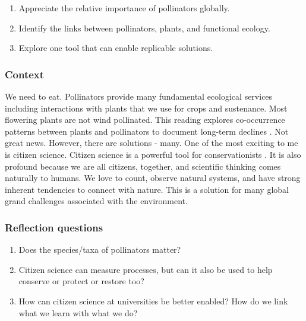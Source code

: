 \documentclass[
]{book}
\providecommand{\tightlist}{%
  \setlength{\itemsep}{0pt}\setlength{\parskip}{0pt}}
\begin{document}
\begin{enumerate}
\def\labelenumi{\arabic{enumi}.}
\tightlist
\item
  Appreciate the relative importance of pollinators globally.
\item
  Identify the links between pollinators, plants, and functional ecology.\\
\item
  Explore one tool that can enable replicable solutions.
\end{enumerate}

\hypertarget{context-1}{%
\subsubsection*{Context}\label{context-1}}

We need to eat. Pollinators provide many fundamental ecological services including interactions with plants that we use for crops and sustenance. Most flowering plants are not wind pollinated. This reading explores co-occurrence patterns between plants and pollinators to document long-term declines \citep{RN6388}. Not great news. However, there are solutions - many. One of the most exciting to me is citizen science. Citizen science is a powerful tool for conservationists \citep{RN5997}. It is also profound because we are all citizens, together, and scientific thinking comes naturally to humans. We love to count, observe natural systems, and have strong inherent tendencies to connect with nature. This is a solution for many global grand challenges associated with the environment.

\hypertarget{reflection-questions-1}{%
\subsubsection*{Reflection questions}\label{reflection-questions-1}}

\begin{enumerate}
\def\labelenumi{\arabic{enumi}.}
\tightlist
\item
  Does the species/taxa of pollinators matter?\\
\item
  Citizen science can measure processes, but can it also be used to help conserve or protect or restore too?\\
\item
  How can citizen science at universities be better enabled? How do we link what we learn with what we do?
\end{enumerate}
\end{document}
